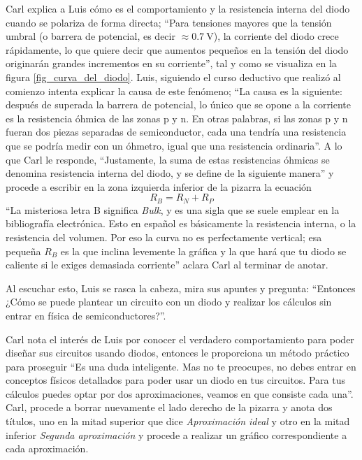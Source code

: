 Carl explica a Luis cómo es el comportamiento y la resistencia interna del diodo cuando se polariza de forma directa; ``Para tensiones mayores que la tensión umbral (o barrera de potencial, es decir \(\approx\qty{0.7}{\volt}\)), la corriente del diodo crece rápidamente, lo que quiere decir que aumentos pequeños en la tensión del diodo originarán grandes incrementos en su corriente'', tal y como se visualiza en la figura \ref{fig_curva_del_diodo}. Luis, siguiendo el curso deductivo que realizó al comienzo intenta explicar la causa de este fenómeno; ``La causa es la siguiente: después de superada la barrera de potencial, lo único que se opone a la corriente es la resistencia óhmica de las zonas p y n. En otras palabras, si las zonas p y n fueran dos piezas separadas de semiconductor, cada una tendría una resistencia que se podría medir con un óhmetro, igual que una resistencia ordinaria''. A lo que Carl le responde, ``Justamente, la suma de estas resistencias óhmicas se denomina resistencia interna del diodo, y se define de la siguiente manera'' y procede a escribir en la zona izquierda inferior de la pizarra la ecuación 
\[
  R_B=R_N+R_P
\]
``La misteriosa letra B significa \emph{Bulk}, y es una sigla que se suele emplear en la bibliografía electrónica. Esto en español es básicamente la resistencia interna, o la resistencia del volumen. Por eso la curva no es perfectamente vertical; esa pequeña \(R_B\) es la que inclina levemente la gráfica y la que hará que tu diodo se caliente si le exiges demasiada corriente'' aclara Carl al terminar de anotar.

Al escuchar esto, Luis se rasca la cabeza, mira sus apuntes y pregunta: ``Entonces ¿Cómo se puede plantear un circuito con un diodo y realizar los cálculos sin entrar en física de semiconductores?''.

Carl nota el interés de Luis por conocer el verdadero comportamiento para poder diseñar sus circuitos usando diodos, entonces le proporciona un método práctico para proseguir ``Es una duda inteligente. Mas no te preocupes, no debes entrar en conceptos físicos detallados para poder usar un diodo en tus circuitos. Para tus cálculos puedes optar por dos aproximaciones, veamos en que consiste cada una''. Carl, procede a borrar nuevamente el lado derecho de la pizarra y anota dos títulos, uno en la mitad superior que dice \emph{Aproximación ideal} y otro en la mitad inferior \emph{Segunda aproximación} y procede a realizar un gráfico correspondiente a cada aproximación.

